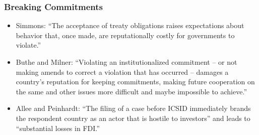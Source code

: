 \documentclass[10pt]{beamer}
\begin{document}
\begin{frame}
\frametitle{Breaking Commitments}

\begin{itemize}
	\item Simmons: ``The acceptance of treaty obligations raises expectations about behavior that, once made, are reputationally costly for governments to violate.'' 
	\item Buthe and Milner: ``Violating an institutionalized commitment – or not making amends to correct a violation that has occurred – damages a country's reputation for keeping commitments, making future cooperation on the same and other issues more difficult and maybe impossible to achieve.'' 
	\item Allee and Peinhardt: ``The filing of a case before ICSID immediately brands the respondent country as an actor that is hostile to investors'' and leads to ``substantial losses in FDI.''
\end{itemize}



\end{frame}
\end{document}
